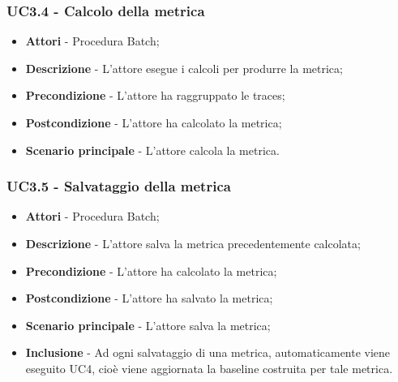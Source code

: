                 \subsubsection{UC3.4 - Calcolo della metrica}


                    \begin{itemize}

                        \item \textbf{Attori} - Procedura Batch;
                        \item \textbf{Descrizione} - L'attore esegue i calcoli per produrre la metrica;
                        \item \textbf{Precondizione} - L'attore ha raggruppato le traces;
                        \item \textbf{Postcondizione} - L'attore ha calcolato la metrica;
                        \item \textbf{Scenario principale} - L'attore calcola la metrica.

                    \end{itemize}

                \subsubsection{UC3.5 - Salvataggio della metrica}

                    \begin{itemize}

                        \item \textbf{Attori} - Procedura Batch;
                        \item \textbf{Descrizione} - L'attore salva la metrica precedentemente calcolata;
                        \item \textbf{Precondizione} - L'attore ha calcolato la metrica;
                        \item \textbf{Postcondizione} - L'attore ha salvato la metrica;
                        \item \textbf{Scenario principale} - L'attore salva la metrica;
                        \item \textbf{Inclusione} - Ad ogni salvataggio di una metrica, automaticamente viene eseguito UC4,
                        cioè viene aggiornata la baseline costruita per tale metrica.

                    \end{itemize}

